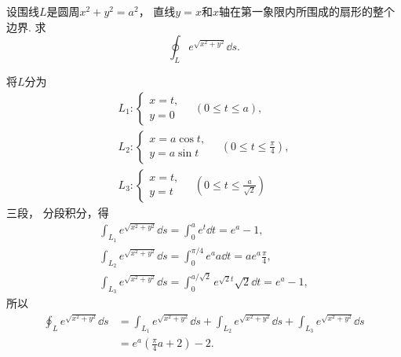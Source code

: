 \begin{example}
设围线\(L\)是圆周\(x^2+y^2=a^2\)，
直线\(y=x\)和\(x\)轴在第一象限内所围成的扇形的整个边界.
求\begin{equation*}
	\oint_L e^{\sqrt{x^2+y^2}} \dd{s}.
\end{equation*}
\begin{solution}
将\(L\)分为\begin{gather*}
	L_1: \left\{ \begin{array}{l}
		x = t, \\
		y = 0
	\end{array} \right.
	\quad(0 \leq t \leq a), \\
	L_2: \left\{ \begin{array}{l}
		x = a \cos t, \\
		y = a \sin t
	\end{array} \right.
	\quad(0 \leq t \leq \frac{\pi}{4}), \\
	L_3: \left\{ \begin{array}{l}
		x = t, \\
		y = t
	\end{array} \right.
	\quad(0 \leq t \leq \frac{a}{\sqrt{2}})
\end{gather*}
三段，
分段积分，得\begin{gather*}
	\int_{L_1} e^{\sqrt{x^2+y^2}} \dd{s}
	= \int_0^a e^t \dd{t}
	= e^a-1, \\
	\int_{L_2} e^{\sqrt{x^2+y^2}} \dd{s}
	= \int_0^{\pi/4} e^a a \dd{t}
	= a e^a \frac{\pi}{4}, \\
	\int_{L_3} e^{\sqrt{x^2+y^2}} \dd{s}
	= \int_0^{a/\sqrt{2}} e^{\sqrt{2}t} \sqrt{2} \dd{t}
	= e^a-1,
\end{gather*}
所以\begin{align*}
	\oint_L e^{\sqrt{x^2+y^2}} \dd{s}
	&= \int_{L_1} e^{\sqrt{x^2+y^2}} \dd{s}
	+ \int_{L_2} e^{\sqrt{x^2+y^2}} \dd{s}
	+ \int_{L_3} e^{\sqrt{x^2+y^2}} \dd{s} \\
	&= e^a \left(\frac{\pi}{4}a + 2\right) - 2.
\end{align*}
\end{solution}
\end{example}

